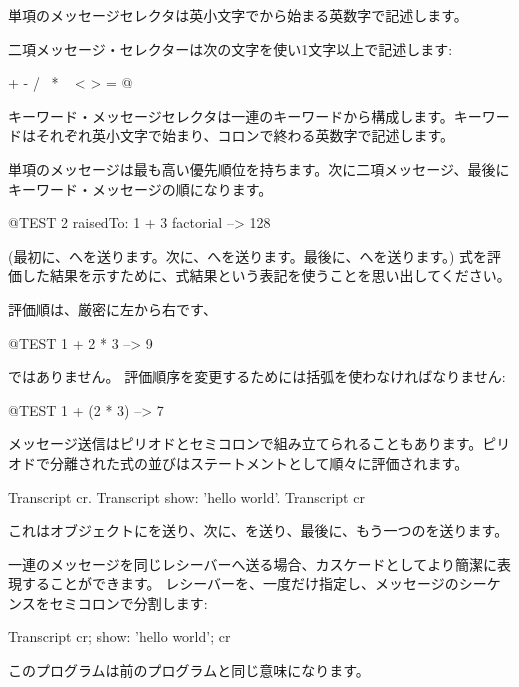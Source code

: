 \documentclass[a4paper,10pt,twoside]{book}
\begin{document}
単項のメッセージセレクタは英小文字でから始まる英数字で記述します。

二項メッセージ・セレクターは次の文字を使い1文字以上で記述します:
\begin{code}{}
+ - / \ * ~ < > = @ %
\end{code}
\noindent
キーワード・メッセージセレクタは一連のキーワードから構成します。キーワードはそれぞれ英小文字で始まり、コロンで終わる英数字で記述します。

単項のメッセージは最も高い優先順位を持ちます。次に二項メッセージ、最後にキーワード・メッセージの順になります。
\begin{code}{@TEST}
2 raisedTo: 1 + 3 factorial --> 128
\end{code}
(最初に、へを送ります。次に、へを送ります。最後に、へを送ります。)
式を評価した結果を示すために、式\ct{-->}結果という表記を使うことを思い出してください。

評価順は、厳密に左から右です、
\begin{code}{@TEST}
1 + 2 * 3 --> 9
\end{code}
ではありません。
評価順序を変更するためには括弧を使わなければなりません:
\begin{code}{@TEST}
1 + (2 * 3) --> 7
\end{code}

メッセージ送信はピリオドとセミコロンで組み立てられることもあります。ピリオドで分離された式の並びはステートメントとして順々に評価されます。

\begin{code}{}
Transcript cr.
Transcript show: 'hello world'.
Transcript cr
\end{code}

\noindent
これはオブジェクトにを送り、次に、を送り、最後に、もう一つのを送ります。

一連のメッセージを同じレシーバーへ送る場合、カスケードとしてより簡潔に表現することができます。
レシーバーを、一度だけ指定し、メッセージのシーケンスをセミコロンで分割します:

\begin{code}{}
Transcript cr;
    show: 'hello world';
    cr
\end{code}
このプログラムは前のプログラムと同じ意味になります。
\end{document}
